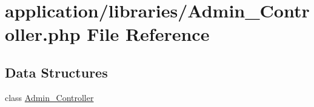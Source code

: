 \hypertarget{_admin___controller_8php}{\section{application/libraries/\-Admin\-\_\-\-Controller.php File Reference}
\label{_admin___controller_8php}
}
\subsection*{Data Structures}
\begin{DoxyCompactItemize}
\item 
class \hyperlink{class_admin___controller}{Admin\-\_\-\-Controller}
\end{DoxyCompactItemize}
